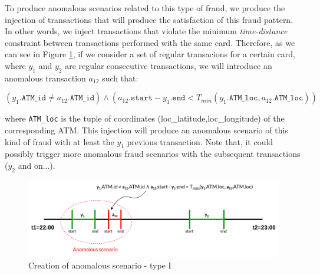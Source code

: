 \documentclass{article}
\begin{document}
To produce anomalous scenarios related to this type of fraud, we produce the injection
of transactions that will produce the satisfaction of this fraud pattern. In other words,
we inject transactions that violate the minimum \emph{time-distance} constraint between transactions performed with the same card. Therefore, as we can see in Figure \ref{img:anomalous-type-1}, if we consider a set of regular transacions for a certain card, where $y_1$ and $y_2$ are regular consecutive transactions, we will introduce an anomalous transaction $a_{12}$ such that: 

$$(y_1.\texttt{ATM\_id} \ne a_{12}.\texttt{ATM\_id}) \land (a_{12}.\texttt{start} - 
y_1.\texttt{end} < T_{min}(y_1.\texttt{ATM\_loc}, a_{12}.\texttt{ATM\_loc}))$$

where \texttt{ATM\_loc} is the tuple of coordinates (loc\_latitude,loc\_longitude) of the corresponding ATM. This injection will produce an anomalous scenario of this kind of fraud with at least the $y_1$ previous transaction. Note that, it could possibly trigger more anomalous fraud scenarios with the subsequent transactions ($y_2$ and on...).

\begin{figure}[H]
    \centering
    \includegraphics[width=\textwidth]{images/tx-generation.png}
    \caption{Creation of anomalous scenario - type I}
    \label{img:anomalous-type-1}
\end{figure}
\end{document}

